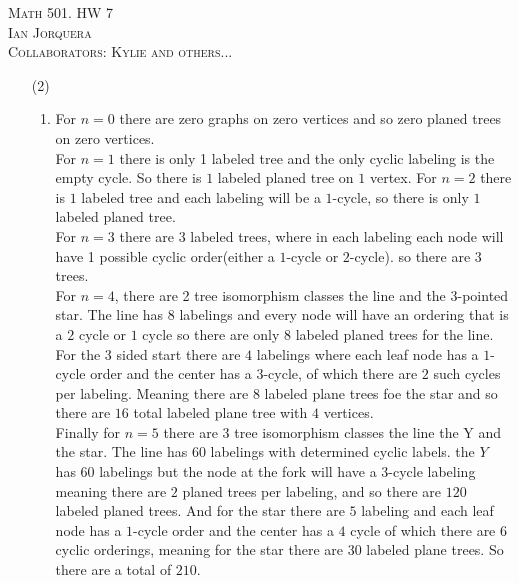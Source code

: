 \documentclass[12pt]{amsart}
\theoremstyle{definition}
\begin{document}
\begin{center}
    \textsc{Math 501. HW 7\\ Ian Jorquera\\ Collaborators: Kylie and others...}
\end{center}
\vspace{1em}


\begin{itemize}

\item[(2)] 
\begin{enumerate}[label=(\alph*)]
    \item For $n=0$ there are zero graphs on zero vertices and so zero planed trees on zero vertices.\\For $n=1$ there is only 1 labeled tree and the only cyclic labeling is the empty cycle. So there is $1$ labeled planed tree on $1$ vertex. For $n=2$ there is $1$ labeled tree and each labeling will be a $1$-cycle, so there is only $1$ labeled planed tree.\\ For $n=3$ there are $3$ labeled trees, where in each labeling each node will have 1 possible cyclic order(either a $1$-cycle or $2$-cycle). so there are $3$ trees.\\ For $n=4$, there are 2 tree isomorphism classes the line and the $3$-pointed star. The line has $8$ labelings and every node will have an ordering that is a $2$ cycle or $1$ cycle so there are only $8$ labeled planed trees for the line. For the $3$ sided start there are $4$ labelings where each leaf node has a $1$-cycle order and the center has a $3$-cycle, of which there are $2$ such cycles per labeling. Meaning there are $8$ labeled plane trees foe the star and so there are $16$ total labeled plane tree with $4$ vertices.\\
    Finally for $n=5$ there are $3$ tree isomorphism classes the line the Y and the star. The line has $60$ labelings with determined cyclic labels. the $Y$ has $60$ labelings but the node at the fork will have a $3$-cycle labeling meaning there are $2$ planed trees per labeling, and so there are $120$ labeled planed trees. And for the star there are $5$ labeling and each leaf node has a $1$-cycle order and the center has a $4$ cycle of which there are $6$ cyclic orderings, meaning for the star there are $30$ labeled plane trees. So there are a total of $210$.\\


\end{enumerate}
\end{itemize}
\end{document}
